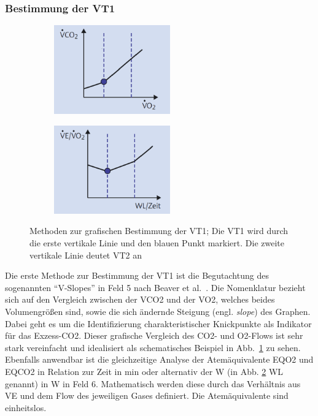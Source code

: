 \subsubsection{Bestimmung der VT1}
%
\begin{figure}[H]
	\centering
	\begin{subfigure}[t]{0.45\textwidth}
		\centering
		\includegraphics[width=50mm]{Bilder/vslope.png}
		\label{subpic:pic5}
	\end{subfigure}%
	\hfil
	\begin{subfigure}[t]{0.45\textwidth}
		\centering
		\includegraphics[width=50mm]{Bilder/eqo2.png}
		\label{subpic:pic6}
	\end{subfigure}
	\caption[Methoden zur grafischen Bestimmung der VT1]{Methoden zur grafischen Bestimmung der VT1; Die VT1 wird durch die erste vertikale Linie und den blauen Punkt markiert. Die zweite vertikale Linie deutet VT2 an~\cite{Kroidl.2015}}
	\label{pic:pic4}
\end{figure}
%
Die erste Methode zur Bestimmung der VT1 ist die Begutachtung des sogenannten "`V-Slopes"' in Feld 5 nach Beaver et al.~\cite{Beaver.1986}. Die Nomenklatur bezieht sich auf den Vergleich zwischen der \gls{VCO2} und der \gls{VO2}, welches beides Volumengrößen sind, sowie die sich ändernde Steigung (engl. \textsl{slope}) des Graphen. Dabei geht es um die Identifizierung charakteristischer Knickpunkte als Indikator für das Exzess-\gls{CO2}. Dieser grafische Vergleich des \gls{CO2}- und \gls{O2}-Flows ist sehr stark vereinfacht und idealisiert als schematisches Beispiel in Abb.~\ref{subpic:pic5} zu sehen. Ebenfalls anwendbar ist die gleichzeitige Analyse der Atemäquivalente \gls{EQO2} und \gls{EQCO2} in Relation zur Zeit in \si{\minute} oder alternativ der \gls{W} (in Abb. \ref{subpic:pic6} \gls{WL} genannt) in \si{\watt} in Feld 6. Mathematisch werden diese durch das Verhältnis aus \gls{VE} und dem Flow des jeweiligen Gases definiert. Die Atemäquivalente sind einheitslos.
